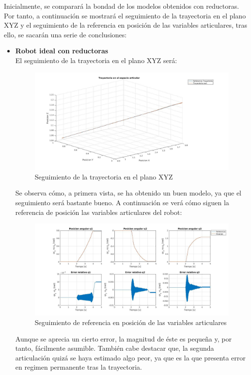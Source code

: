 Inicialmente, se comparará la bondad de los modelos obtenidos con reductoras. Por tanto, a continuación se mostrará el seguimiento de la trayectoria en el plano XYZ y el seguimiento de la referencia en posición de las variables articulares, tras ello, se sacarán una serie de conclusiones:
\begin{itemize}
	\item \textbf{Robot ideal con reductoras} \\
	El seguimiento de la trayectoria en el plano XYZ será:
	\begin{figure}[h!]
		\centering
		\includegraphics[width=.7\textwidth]{exp3_trayPDideal}
		\caption{Seguimiento de la trayectoria en el plano XYZ}
	\end{figure}

	Se observa cómo, a primera vista, se ha obtenido un buen modelo, ya que el seguimiento será bastante bueno. A continuación se verá cómo siguen la referencia de posición las variables articulares del robot:

	\begin{figure}[h!]
		\centering
		\includegraphics[width=.8\textwidth]{exp3_posPDidealCR}
		\caption{Seguimiento de referencia en posición de las variables articulares}
	\end{figure}


	Aunque se aprecia un cierto error, la magnitud de éste es pequeña y, por tanto, fácilmente asumible. También cabe destacar que, la segunda articulación quizá se haya estimado algo peor, ya que es la que presenta error en regimen permanente tras la trayectoria. \\


\end{itemize}
